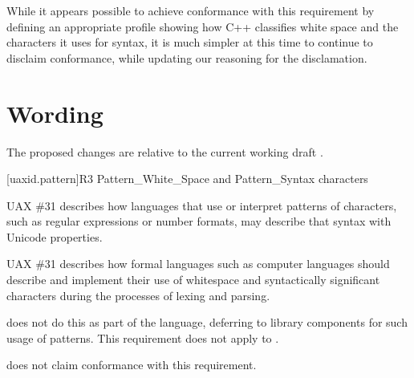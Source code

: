 \documentclass[a4paper,10pt,oneside,openany,final,article]{memoir}
\begin{document}
While it appears possible to achieve conformance with this requirement by defining an appropriate profile showing how C++ classifies white space and the characters it uses for syntax, it is much simpler at this time to continue to disclaim conformance, while updating our reasoning for the disclamation.

\chapter{Wording}

The proposed changes are relative to the current working draft \cite{N4917}.

\begin{wording}


\setcounter{section}{3}
[uaxid.pattern]{R3 Pattern_White_Space and Pattern_Syntax characters}

\pnum

\begin{removedblock}
UAX \#31 describes how languages that use or interpret patterns of characters,
such as regular expressions or number formats,
may describe that syntax with Unicode properties.
\end{removedblock}

\begin{addedblock}
UAX \#31 describes how formal languages such as computer languages should describe and implement their use of whitespace and syntactically significant characters during the processes of lexing and parsing.
\end{addedblock}

\pnum

\begin{removedblock}
\Cpp{} does not do this as part of the language,
deferring to library components for such usage of patterns.
This requirement does not apply to \Cpp{}.
\end{removedblock}

\begin{addedblock}
\Cpp{} does not claim conformance with this requirement.
\end{addedblock}

\end{wording}

\renewcommand{\bibname}{References}



\nocite{UAX31-14:online}
\nocite{UAX31-15:online}
\nocite{UAX31-DIFF:online}
\end{document}
